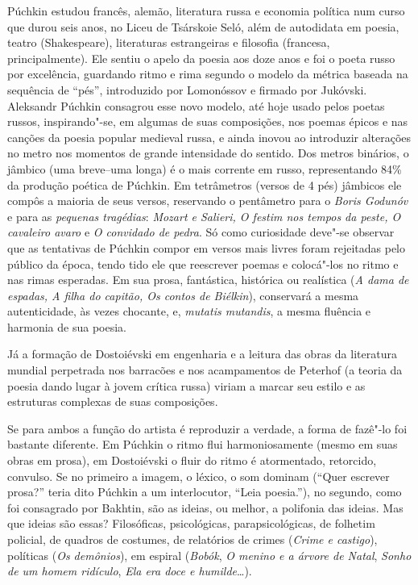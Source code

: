 Púchkin estudou francês, alemão, literatura russa e economia política
num curso que durou seis anos, no Liceu de Tsárskoie Seló, além de autodidata em poesia, teatro (Shakespeare), literaturas
estrangeiras e filosofia (francesa, principalmente). Ele sentiu o apelo da poesia aos doze anos e foi o poeta
russo por excelência, guardando ritmo e rima segundo o modelo da métrica baseada na sequência de ``pés'', introduzido por Lomonóssov e firmado por Jukóvski. Aleksandr Púchkin consagrou esse novo modelo, até hoje usado pelos poetas russos, inspirando"-se, em algumas de suas composições, nos poemas épicos e nas canções da poesia popular medieval russa, e ainda inovou ao introduzir alterações no metro nos momentos de grande intensidade do sentido. Dos metros binários, o jâmbico (uma breve--uma longa) é o mais corrente em russo, representando 84\% da produção poética de Púchkin. Em tetrâmetros (versos de 4 pés) jâmbicos ele compôs a maioria de seus versos, reservando o pentâmetro para o \emph{Boris Godunóv} e para as \emph{pequenas tragédias}: \emph{Mozart e Salieri, O festim nos tempos da peste, O cavaleiro avaro} e \emph{O convidado de pedra}. Só como curiosidade deve"-se observar que as tentativas de Púchkin compor em versos mais livres foram rejeitadas pelo público da época, tendo tido ele que reescrever poemas e colocá"-los no ritmo e nas rimas esperadas. Em sua prosa, fantástica, histórica ou realística (\emph{A dama de espadas, A filha do capitão, Os contos de Biélkin}), conservará a mesma autenticidade, às vezes chocante, e, \emph{mutatis mutandis}, a mesma fluência e harmonia de sua poesia.

Já a formação de Dostoiévski em engenharia e a leitura das obras
da literatura mundial perpetrada nos barracões e nos acampamentos de
Peterhof (a teoria da poesia dando lugar à jovem crítica russa) viriam a marcar seu estilo e as estruturas complexas de suas composições.

Se para ambos a função do artista é reproduzir a verdade, a forma
de fazê"-lo foi bastante diferente. Em Púchkin o ritmo flui
harmoniosamente (mesmo em suas obras em prosa), em Dostoiévski o
fluir do ritmo é atormentado, retorcido, convulso. Se no primeiro
a imagem, o léxico, o som dominam (``Quer escrever prosa?'' teria
dito Púchkin a um interlocutor, ``Leia poesia.''), no segundo,
como foi consagrado por Bakhtin, são as ideias, ou melhor, a
polifonia das ideias. Mas que ideias são essas? Filosóficas, psicológicas, parapsicológicas, de folhetim policial, de quadros de costumes, de relatórios de crimes (\emph{Crime e
castigo}), políticas (\emph{Os demônios}), em espiral
(\emph{Bobók}, \emph{O menino e a árvore de Natal}, \emph{Sonho de um homem ridículo}, \emph{Ela era doce e humilde}\ldots{}).

